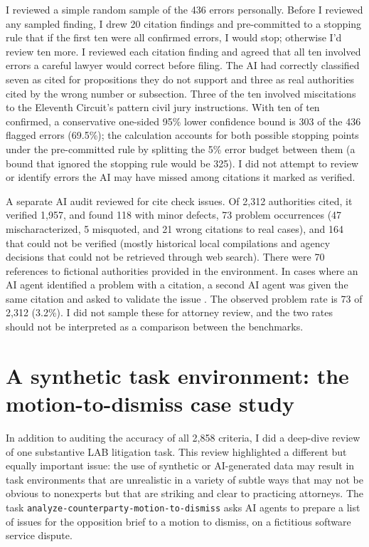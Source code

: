 \documentclass[11pt]{article}
\newcommand{\labCriteria}{2{,}858}
\newcommand{\labCitationErrors}{436}
\newcommand{\labCitationErrorsLB}{303}
\begin{document}
I reviewed a simple random sample of the \labCitationErrors{} errors personally. Before I reviewed any sampled finding, I drew 20 citation findings and pre-committed to a stopping rule that if the first ten were all confirmed errors, I would stop; otherwise I'd review ten more. I reviewed each citation finding and agreed that all ten involved errors a careful lawyer would correct before filing. The AI had correctly classified seven as cited for propositions they do not support and three as real authorities cited by the wrong number or subsection. Three of the ten involved miscitations to the Eleventh Circuit's pattern civil jury instructions. With ten of ten confirmed, a conservative one-sided 95\% lower confidence bound is \labCitationErrorsLB{} of the \labCitationErrors{} flagged errors (69.5\%); the calculation accounts for both possible stopping points under the pre-committed rule by splitting the 5\% error budget between them (a bound that ignored the stopping rule would be 325). I did not attempt to review or identify errors the AI may have missed among citations it marked as verified.

A separate AI audit reviewed for cite check issues. Of 2,312 authorities cited, it verified 1,957, and found 118 with minor defects, 73 problem occurrences (47 mischaracterized, 5 misquoted, and 21 wrong citations to real cases), and 164 that could not be verified (mostly historical local compilations and agency decisions that could not be retrieved through web search). There were 70 references to fictional authorities provided in the environment. In cases where an AI agent identified a problem with a citation, a second AI agent was given the same citation and asked to validate the issue \citep{lrbaudit}. The observed problem rate is 73 of 2,312 (3.2\%). I did not sample these for attorney review, and the two rates should not be interpreted as a comparison between the benchmarks.

\clearpage
\section{A synthetic task environment: the motion-to-dismiss case study}
\label{app:mtd}

In addition to auditing the accuracy of all \labCriteria{} criteria, I did a deep-dive review of one substantive LAB litigation task. This review highlighted a different but equally important issue: the use of synthetic or AI-generated data may result in task environments that are unrealistic in a variety of subtle ways that may not be obvious to nonexperts but that are striking and clear to practicing attorneys. The task \texttt{analyze-counterparty-motion-to-dismiss} asks AI agents to prepare a list of issues for the opposition brief to a motion to dismiss, on a fictitious software service dispute.
\end{document}
